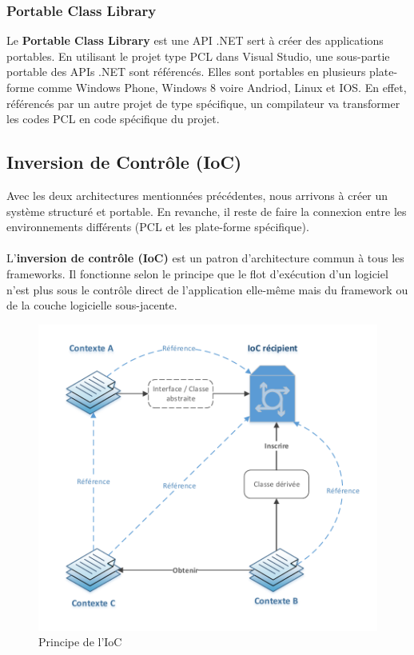\documentclass{article}
\begin{document}
\vspace{0.2 cm}
\subsubsection{\large Portable Class Library}
Le \textbf{Portable Class Library} est une API .NET sert à créer des applications portables. En utilisant le projet type PCL dans Visual Studio, une sous-partie portable des APIs .NET sont référencés. Elles sont portables en plusieurs plate-forme comme Windows Phone, Windows 8 voire Andriod, Linux et IOS. En effet, référencés par un autre projet de type spécifique, un compilateur va transformer les codes PCL en code spécifique du projet. 

\vspace{0.2 cm}
\subsection{\Large Inversion de Contrôle (IoC)}
Avec les deux architectures mentionnées précédentes, nous arrivons à créer un système structuré et portable. En revanche, il reste de faire la connexion entre les environnements différents (PCL et les plate-forme spécifique). 
\\\\
L’\textbf{inversion de contrôle (IoC)} est un patron d'architecture commun à tous les frameworks. Il fonctionne selon le principe que le flot d'exécution d'un logiciel n'est plus sous le contrôle direct de l'application elle-même mais du framework ou de la couche logicielle sous-jacente. 
\\
\begin{figure}[h!]
\centering
\includegraphics[width=120mm]{IOC.pdf}
\caption{Principe de l'IoC}
\end{figure}
\end{document}
